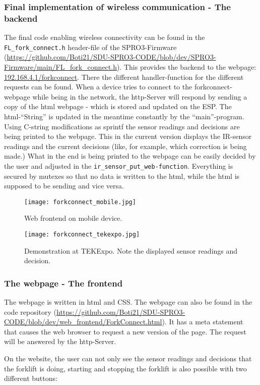 \documentclass[../report.tex]{subfiles}
\begin{document}
\subsubsection{Final implementation of wireless communication - The backend}
The final code enabling wireless connectivity can be found in the 
\texttt{FL\_fork\_connect.h} header-file of the SPRO3-Firmware (\url{https://github.com/Boti21/SDU-SPRO3-CODE/blob/dev/SPRO3-Firmware/main/FL_fork_connect.h}).
This provides the backend to the webpage: \url{192.168.4.1/forkconnect}.
There the different handler-function for the different requests can be found.
When a device tries to connect to the forkconnect-webpage while being in the network,
the http-Server will respond by sending a copy of the html webpage - which is stored and updated on the ESP. The html-``String'' is updated in the 
meantime constantly by the ``main''-program. Using C-string modifications as sprintf the sensor readings
and decisions are being printed to the webpage. This in the current version displays the IR-sensor readings
and the current decisions (like, for example, which correction is being made.) What in the end is being 
printed to the webpage can be easily decided by the user and adjusted in the \texttt{ir\_sensor\_put\_web-function}.
Everything is secured by mutexes so that no data is written to the html, while the html is supposed
to be sending and vice versa. 
\begin{figure}[H]
    \centering
    \texttt{[image: forkconnect\_mobile.jpg]}
    \caption{Web frontend on mobile device.}
    
\end{figure} 
\begin{figure}[H]
    \centering
    \texttt{[image: forkconnect\_tekexpo.jpg]}
    \caption{Demonstration at TEKExpo. Note the displayed sensor readings and decision.}
\end{figure} 
\subsubsection{The webpage - The frontend}
The webpage is written in html and CSS. The webpage can also be found in the code 
repository (\url{https://github.com/Boti21/SDU-SPRO3-CODE/blob/dev/web_frontend/ForkConnect.html}).
It has a meta statement that causes the web browser to request a new version of the page.
The request will be answered by the http-Server. 

On the website, the user can not only see the sensor readings and decisions that the forklift is doing,
starting and stopping the forklift is also possible with two different buttons: 
\end{document}
